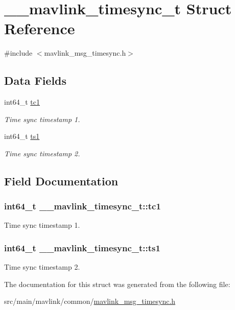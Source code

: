 \hypertarget{struct____mavlink__timesync__t}{\section{\+\_\+\+\_\+mavlink\+\_\+timesync\+\_\+t Struct Reference}
\label{struct____mavlink__timesync__t}
}


{\ttfamily \#include $<$mavlink\+\_\+msg\+\_\+timesync.\+h$>$}

\subsection*{Data Fields}
\begin{DoxyCompactItemize}
\item 
int64\+\_\+t \hyperlink{struct____mavlink__timesync__t_a87902cfcc03aba442400a7188987f788}{tc1}
\begin{DoxyCompactList}\small\item\em Time sync timestamp 1. \end{DoxyCompactList}\item 
int64\+\_\+t \hyperlink{struct____mavlink__timesync__t_a53a7b387af0c4caa970e738d2e13a725}{ts1}
\begin{DoxyCompactList}\small\item\em Time sync timestamp 2. \end{DoxyCompactList}\end{DoxyCompactItemize}


\subsection{Field Documentation}
\hypertarget{struct____mavlink__timesync__t_a87902cfcc03aba442400a7188987f788}{
\subsubsection[{tc1}]{\setlength{\rightskip}{0pt plus 5cm}int64\+\_\+t \+\_\+\+\_\+mavlink\+\_\+timesync\+\_\+t\+::tc1}}\label{struct____mavlink__timesync__t_a87902cfcc03aba442400a7188987f788}


Time sync timestamp 1. 

\hypertarget{struct____mavlink__timesync__t_a53a7b387af0c4caa970e738d2e13a725}{
\subsubsection[{ts1}]{\setlength{\rightskip}{0pt plus 5cm}int64\+\_\+t \+\_\+\+\_\+mavlink\+\_\+timesync\+\_\+t\+::ts1}}\label{struct____mavlink__timesync__t_a53a7b387af0c4caa970e738d2e13a725}


Time sync timestamp 2. 



The documentation for this struct was generated from the following file\+:\begin{DoxyCompactItemize}
\item 
src/main/mavlink/common/\hyperlink{mavlink__msg__timesync_8h}{mavlink\+\_\+msg\+\_\+timesync.\+h}\end{DoxyCompactItemize}

